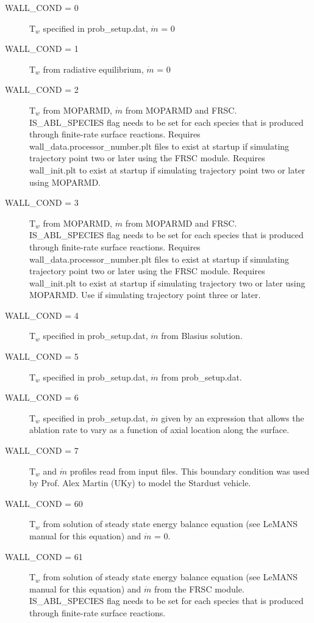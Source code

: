 \documentclass[]{article}
\begin{document}
\begin{description}
\item[WALL\_COND = 0] T$_w$ specified in prob\_setup.dat, $\dot{m}$ = 0
\item[WALL\_COND = 1] T$_w$ from radiative equilibrium, $\dot{m}$ = 0
\item[WALL\_COND = 2] T$_w$ from MOPARMD, $\dot{m}$ from MOPARMD and FRSC.  IS\_ABL\_SPECIES flag needs to be set for each species that is produced through finite-rate surface reactions.  Requires \\
wall\_data.processor\_number.plt files to exist at startup if simulating trajectory point two or later using the FRSC module.  Requires wall\_init.plt to exist at startup if simulating trajectory point two or later using MOPARMD.
\item[WALL\_COND = 3] T$_w$ from MOPARMD, $\dot{m}$ from MOPARMD and FRSC.  IS\_ABL\_SPECIES flag needs to be set for each species that is produced through finite-rate surface reactions.  Requires \\
wall\_data.processor\_number.plt files to exist at startup if simulating trajectory point two or later using the FRSC module.  Requires wall\_init.plt to exist at startup if simulating trajectory two or later using MOPARMD.  Use if simulating trajectory point three or later. 
\item[WALL\_COND = 4] T$_w$ specified in prob\_setup.dat, $\dot{m}$ from Blasius solution.
\item[WALL\_COND = 5] T$_w$ specified in prob\_setup.dat, $\dot{m}$ from prob\_setup.dat.
\item[WALL\_COND = 6] T$_w$ specified in prob\_setup.dat, $\dot{m}$ given by an expression that allows the ablation rate to vary as a function of axial location along the surface.
\item[WALL\_COND = 7] T$_w$ and $\dot{m}$ profiles read from input files.  This boundary condition was used by Prof. Alex Martin (UKy) to model the Stardust vehicle.
\item[WALL\_COND = 60] T$_w$ from solution of steady state energy balance equation (see LeMANS manual for this equation) and $\dot{m}$  = 0.
\item[WALL\_COND = 61] T$_w$ from solution of steady state energy balance equation (see LeMANS manual for this equation) and $\dot{m}$  from the FRSC module.  IS\_ABL\_SPECIES flag needs to be set for each species that is produced through finite-rate surface reactions.
\end{description} 
\end{document}

